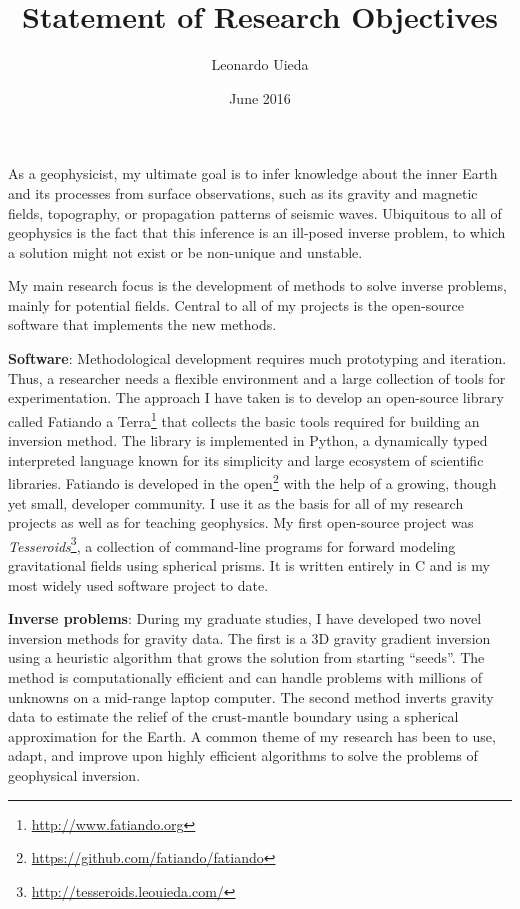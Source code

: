 \documentclass[12pt]{article}
\title{\textbf{Statement of Research Objectives}}
\author{Leonardo Uieda}
\date{June 2016}
\begin{document}
\maketitle


As a geophysicist,
my ultimate goal is
to infer knowledge about the inner Earth
and its processes
from surface observations,
such as its gravity and magnetic fields,
topography,
or propagation patterns of seismic waves.
%
Ubiquitous to all of geophysics
is the fact that this inference
is an ill-posed inverse problem,
to which a solution might not exist
or be non-unique and unstable.


My main research focus is
the development of methods
to solve inverse problems,
mainly for potential fields.
%
Central to all of my projects
is the open-source software
that implements the new methods.


\textbf{Software}:
Methodological development requires
much prototyping and iteration.
%
Thus,
a researcher needs
a flexible environment
and a large collection of tools
for experimentation.
%
The approach I have taken is
to develop an open-source library
called Fatiando a Terra\footnote{\url{http://www.fatiando.org}}
that collects the basic tools
required for building an inversion method.
%
The library is implemented in Python,
a dynamically typed interpreted language
known for its simplicity
and large ecosystem of scientific libraries.
%
Fatiando is developed in the
open\footnote{\url{https://github.com/fatiando/fatiando}}
with the help of a growing, though yet small,
developer community.
%
I use it as the basis for
all of my research projects
as well as for teaching geophysics.
%
My first open-source project
was \textit{Tesseroids}\footnote{\url{http://tesseroids.leouieda.com/}},
a collection of command-line programs
for forward modeling gravitational fields
using spherical prisms.
%
It is written entirely in C
and is my most widely used software project to date.


\textbf{Inverse problems}:
During my graduate studies,
I have developed two novel inversion methods
for gravity data.
%
The first is a 3D gravity gradient inversion
using a heuristic algorithm
that grows the solution from starting ``seeds''.
%
The method is computationally efficient
and can handle problems with millions of unknowns
on a mid-range laptop computer.
%
The second method inverts gravity data
to estimate the relief
of the crust-mantle boundary
using a spherical approximation for the Earth.
%
A common theme of my research has been
to use, adapt, and improve upon
highly efficient algorithms
to solve the problems of geophysical inversion.
\end{document}
